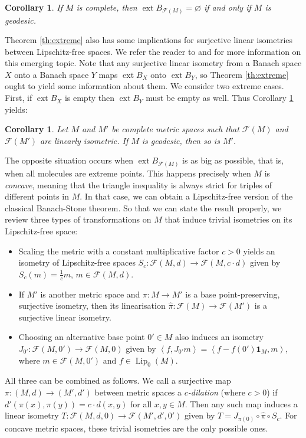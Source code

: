 \documentclass[a4paper,10pt]{amsart}
\DeclareMathOperator{\ext}{ext}                             %
\DeclareMathOperator{\Lip}{Lip}                             %
\newcommand{\duality}[1]{\left<{#1}\right>}                 %
\newcommand{\lipfree}[1]{\mathcal{F}({#1})}                 %
\theoremstyle{plain}
\newtheorem{corollary}[theorem]{Corollary}
\theoremstyle{definition}
\theoremstyle{remark}
\begin{document}
\begin{corollary}\label{cr:geodesic}
If $M$ is complete, then $\ext B_{\lipfree{M}}=\varnothing$ if and only if $M$ is geodesic.
\end{corollary}

Theorem \ref{th:extreme} also has some implications for surjective linear isometries between Lipschitz-free spaces. We refer the reader to \cite{AFGLZ_20,CDT_24} and \cite[Section 3.8]{Weaver2} for more information on this emerging topic. Note that any surjective linear isometry from a Banach space $X$ onto a Banach space $Y$ maps $\ext B_X$ onto $\ext B_Y$, so Theorem \ref{th:extreme} ought to yield some information about them. We consider two extreme cases. First, if $\ext B_X$ is empty then $\ext B_Y$ must be empty as well. Thus Corollary \ref{cr:geodesic} yields:

\begin{corollary}\label{cr:isometries}
Let $M$ and $M'$ be complete metric spaces such that $\lipfree{M}$ and $\lipfree{M'}$ are linearly isometric. If $M$ is geodesic, then so is $M'$.
\end{corollary}


The opposite situation occurs when $\ext B_{\lipfree{M}}$ is as big as possible, that is, when all molecules are extreme points. This happens precisely when $M$ is \emph{concave}, meaning that the triangle inequality is always strict for triples of different points in $M$. In that case, we can obtain a Lipschitz-free version of the classical Banach-Stone theorem. So that we can state the result properly, we review three types of transformations on $M$ that induce trivial isometries on its Lipschitz-free space:
\begin{itemize}
\item Scaling the metric with a constant multiplicative factor $c>0$ yields an isometry of Lipschitz-free spaces $S_c:\lipfree{M,d}\to\lipfree{M,c\cdot d}$ given by $S_c(m)=\frac{1}{c}m$, $m\in\lipfree{M,d}$.
\item If $M'$ is another metric space and $\pi:M\to M'$ is a base point-preserving, surjective isometry, then its linearisation $\widehat{\pi}:\lipfree{M}\to\lipfree{M'}$ is a surjective linear isometry.
\item Choosing an alternative base point $0' \in M$ also induces an isometry $J_{0'}:\lipfree{M,0'}\to\lipfree{M,0}$ given by $\duality{f,J_{0'}m}=\duality{f-f(0')\mathbf{1}_M,m}$, where $m \in \lipfree{M,0'}$ and $f \in \Lip_0(M)$.
\end{itemize}
All three can be combined as follows. We call a surjective map $\pi:(M,d)\to (M',d')$ between metric spaces a \emph{$c$-dilation} (where $c>0$) if $d'(\pi(x),\pi(y))=c\cdot d(x,y)$ for all $x,y \in M$. Then any such map induces a linear isometry $T:\lipfree{M,d,0}\to\lipfree{M',d',0'}$ given by $T=J_{\pi(0)}\circ\widehat{\pi}\circ S_c$. For concave metric spaces, these trivial isometries are the only possible ones.
\end{document}
